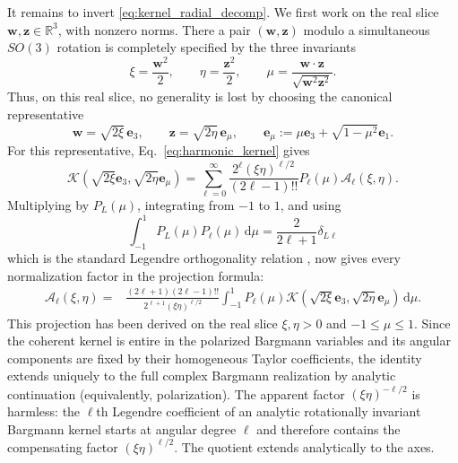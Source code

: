 \documentclass[11pt]{article}
\numberwithin{equation}{section}
\newcommand{\dd}{\,\mathrm d}
\theoremstyle{definition}
\begin{document}
It remains to invert \eqref{eq:kernel_radial_decomp}.  We first work on the
real slice $\bm w,\bm z\in\mathbb R^3$, with nonzero norms.  There a pair
$(\bm w,\bm z)$ modulo a simultaneous $SO(3)$ rotation is completely
specified by the three invariants
\begin{equation}
 \xi=\frac{\bm w^2}{2},\qquad
 \eta=\frac{\bm z^2}{2},\qquad
 \mu=\frac{\bm w\cdot\bm z}{\sqrt{\bm w^2\bm z^2}}.
 \label{eq:orbit_invariants}
\end{equation}
Thus, on this real slice, no generality is lost by choosing the canonical
representative
\begin{equation}
 \bm w=\sqrt{2\xi}\,\bm e_3,
 \qquad
 \bm z=\sqrt{2\eta}\,\bm e_\mu,
 \qquad
 \bm e_\mu:=\mu\bm e_3+\sqrt{1-\mu^2}\bm e_1.
 \label{eq:e_mu_definition}
\end{equation}
For this representative, Eq.~\eqref{eq:harmonic_kernel} gives
\begin{equation}
 \mathcal K\!\left(\sqrt{2\xi}\bm e_3,
                    \sqrt{2\eta}\bm e_\mu\right)
 =\sum_{\ell=0}^\infty
 \frac{2^\ell(\xi\eta)^{\ell/2}}{(2\ell-1)!!}
 P_\ell(\mu)\mathscr A_\ell(\xi,\eta).
 \label{eq:kernel_legendre_series}
\end{equation}
Multiplying by $P_L(\mu)$, integrating from $-1$ to $1$, and using
\begin{equation}
 \int_{-1}^{1}P_L(\mu)P_\ell(\mu)\dd\mu
 =\frac{2}{2\ell+1}\delta_{L\ell}
 \label{eq:Legendre_orthogonality}
\end{equation}
which is the standard Legendre orthogonality relation \cite{NIST2010},
now gives every normalization factor in the projection formula:
\begin{equation}
 \begin{aligned}
 \mathscr A_\ell(\xi,\eta)
 ={}&
 \frac{(2\ell+1)(2\ell-1)!!}
 {2^{\ell+1}(\xi\eta)^{\ell/2}}
 \int_{-1}^1P_\ell(\mu)
 \mathcal K\!\left(
 \sqrt{2\xi}\bm e_3,
 \sqrt{2\eta}\bm e_\mu
 \right)\dd\mu.
 \end{aligned}
 \label{eq:radial_projection}
\end{equation}
This projection has been derived on the real slice $\xi,\eta>0$ and
$-1\leq\mu\leq1$.  Since the coherent kernel is entire in the polarized
Bargmann variables and its angular components are fixed by their homogeneous
Taylor coefficients, the identity extends uniquely to the full complex
Bargmann realization by analytic continuation (equivalently, polarization).
The apparent factor $(\xi\eta)^{-\ell/2}$ is harmless: the $\ell$th
Legendre coefficient of an analytic rotationally invariant Bargmann kernel
starts at angular degree $\ell$ and therefore contains the compensating
factor $(\xi\eta)^{\ell/2}$.  The quotient extends analytically to the axes.
\end{document}
